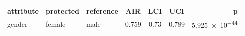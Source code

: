 \AccessibleTableHeaderRow
\begin{tabular}{lllSSSr}
\toprule
attribute & protected & reference & {AIR} & {LCI} & {UCI} & {p}\\
\midrule
gender & female & male & \num{0.759} & \num{0.73} & \num{0.789} & \num[round-mode=figures,round-precision=3]{5.925e-44}\\
\bottomrule
\end{tabular}
